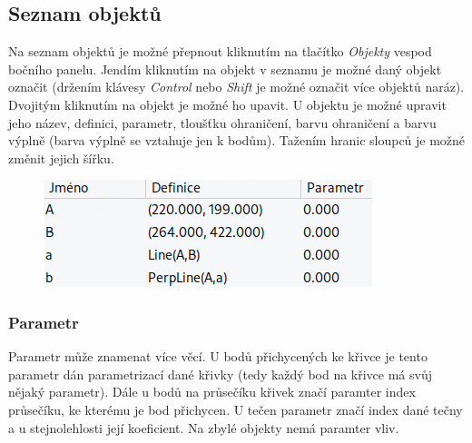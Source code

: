\documentclass[11pt]{article}
\begin{document}
    \subsection{Seznam objektů}
    Na seznam objektů je možné přepnout kliknutím na tlačítko \textit{Objekty} vespod bočního panelu. Jendím kliknutím na objekt v seznamu je možné daný objekt označit (držením klávesy \textit{Control} nebo \textit{Shift} je možné označit více objektů naráz). Dvojitým kliknutím na objekt je možné ho upavit. U objektu je možné upravit jeho název, definici, parametr, tloušťku ohraničení, barvu ohraničení a barvu výplně (barva výplně se vztahuje jen k bodům). Tažením hranic sloupců je možné změnit jejich šířku.
    \begin{figure}[h]
        \begin{center}
        \includegraphics[scale=0.5]{imgs/obj_list.png}
        \end{center}
    \end{figure}
    \vspace{-20pt}
    \subsubsection{Parametr}
    Parametr může znamenat více věcí. U bodů přichycených ke křivce je tento parametr dán parametrizací dané křivky (tedy každý bod na křivce má svůj nějaký parametr). Dále u bodů na průsečíku křivek značí paramter index průsečíku, ke kterému je bod přichycen. U tečen parametr značí index dané tečny a u stejnolehlosti její koeficient. Na zbylé objekty nemá paramter vliv.
\end{document}

